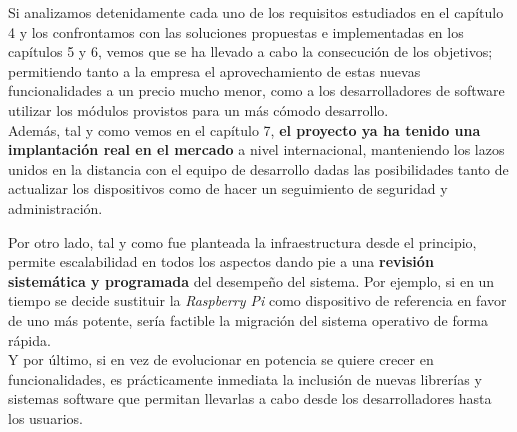 Si analizamos detenidamente cada uno de los requisitos estudiados en el capítulo 4 y los confrontamos con las soluciones propuestas e implementadas en los capítulos 5 y 6, vemos que se ha llevado a cabo la consecución de los objetivos; permitiendo tanto a la empresa el aprovechamiento de estas nuevas funcionalidades a un precio mucho menor, como a los desarrolladores de software utilizar los módulos provistos para un más cómodo desarrollo.\\

Además, tal y como vemos en el capítulo 7, \textbf{el proyecto ya ha tenido una implantación real en el mercado} a nivel internacional, manteniendo los lazos unidos en la distancia con el equipo de desarrollo dadas las posibilidades tanto de actualizar los dispositivos como de hacer un seguimiento de seguridad y administración.

Por otro lado, tal y como fue planteada la infraestructura desde el principio, permite escalabilidad en todos los aspectos dando pie a una \textbf{revisión sistemática y programada} del desempeño del sistema. Por ejemplo, si en un tiempo se decide sustituir la \textit{Raspberry Pi} como dispositivo de referencia en favor de uno más potente, sería factible la migración del sistema operativo de forma rápida.\\

Y por último, si en vez de evolucionar en potencia se quiere crecer en funcionalidades, es prácticamente inmediata la inclusión de nuevas librerías y sistemas software que permitan llevarlas a cabo desde los desarrolladores hasta los usuarios.

\newpage